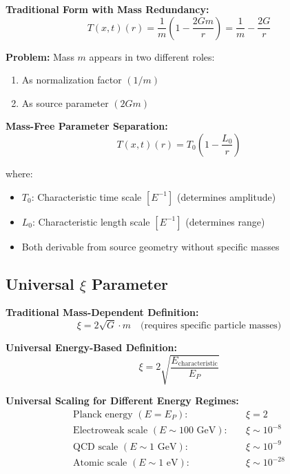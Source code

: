 \documentclass[12pt,a4paper]{report}
\newcommand{\Tfield}{T(x,t)}  %
\newcommand{\xipar}{\xi}      %
\begin{document}
\textbf{Traditional Form with Mass Redundancy:}
\begin{equation}
	\Tfield(r) = \frac{1}{m}\left(1 - \frac{2Gm}{r}\right) = \frac{1}{m} - \frac{2G}{r}
\end{equation}

\textbf{Problem:} Mass $m$ appears in two different roles:
\begin{enumerate}
	\item As normalization factor $(1/m)$
	\item As source parameter $(2Gm)$
\end{enumerate}

\textbf{Mass-Free Parameter Separation:}
\begin{equation}
	\boxed{\Tfield(r) = T_0\left(1 - \frac{L_0}{r}\right)}
\end{equation}

where:
\begin{itemize}
	\item $T_0$: Characteristic time scale $[E^{-1}]$ (determines amplitude)
	\item $L_0$: Characteristic length scale $[E^{-1}]$ (determines range)
	\item Both derivable from source geometry without specific masses
\end{itemize}

\subsection*{Universal $\xipar$ Parameter}

\textbf{Traditional Mass-Dependent Definition:}
\begin{equation}
	\xipar = 2\sqrt{G} \cdot m \quad \text{(requires specific particle masses)}
\end{equation}

\textbf{Universal Energy-Based Definition:}
\begin{equation}
	\boxed{\xipar = 2\sqrt{\frac{E_{\text{characteristic}}}{E_P}}}
\end{equation}

\textbf{Universal Scaling for Different Energy Regimes:}
\begin{align}
	\text{Planck energy } (E = E_P): \quad &\xipar = 2 \\
	\text{Electroweak scale } (E \sim 100 \text{ GeV}): \quad &\xipar \sim 10^{-8} \\
	\text{QCD scale } (E \sim 1 \text{ GeV}): \quad &\xipar \sim 10^{-9} \\
	\text{Atomic scale } (E \sim 1 \text{ eV}): \quad &\xipar \sim 10^{-28}
\end{align}
\end{document}

